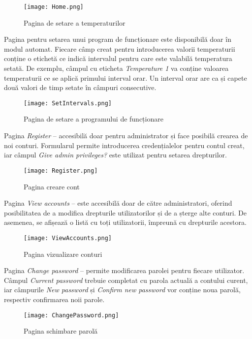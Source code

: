 \begin{figure}[H]
   	\centering
    	\texttt{[image: Home.png]}
	\caption{Pagina de setare a temperaturilor}
\end{figure}

	Pagina pentru setarea unui program de funcționare este disponibilă doar în modul automat. Fiecare câmp creat pentru introducerea valorii temperaturii conține o etichetă ce indică intervalul pentru care este valabilă temperatura setată. De exemplu, câmpul cu eticheta \textit{Temperature 1} va conține valoarea temperaturii ce se aplică primului interval orar. Un interval orar are ca și capete două valori de timp setate în câmpuri consecutive.  

\begin{figure}[H]
   	\centering
    	\texttt{[image: SetIntervals.png]}
	\caption{Pagina de setare a programului de funcționare}
\end{figure}

	Pagina \textit{Register} – accesibilă doar pentru administrator și face posibilă crearea de noi conturi. Formularul permite introducerea credențialelor pentru contul creat, iar câmpul \textit{Give admin privileges?} este utilizat pentru setarea drepturilor.

\begin{figure}[H]
   	\centering
    	\texttt{[image: Register.png]}
	\caption{Pagina creare cont}
\end{figure}

	Pagina \textit{View accounts} – este accesibilă doar de către administratori, oferind posibilitatea de a modifica drepturile utilizatorilor și de a șterge alte conturi. De asemenea, se afișează o listă cu toți utilizatorii, împreună cu drepturile acestora.

\begin{figure}[H]
   	\centering
    	\texttt{[image: ViewAccounts.png]}
	\caption{Pagina vizualizare conturi}
\end{figure}

	Pagina \textit{Change password} – permite modificarea parolei pentru fiecare utilizator. Câmpul \textit{Current password} trebuie completat cu parola actuală a contului curent, iar câmpurile \textit{New password} și \textit{Confirm new password} vor conține noua parolă, respectiv confirmarea noii parole.

\begin{figure}[H]
   	\centering
    	\texttt{[image: ChangePassword.png]}
	\caption{Pagina schimbare parolă}
\end{figure}

